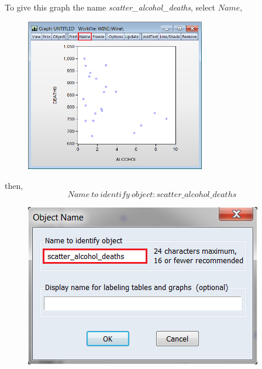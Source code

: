 \documentclass[12pt]{report}
\begin{document}
		\vspace{-\baselineskip}	
		\noindent To give this graph the name \textit{scatter\_alcohol\_deaths}, select $Name$,
		\begin{figure}[H]
			\centerline{\includegraphics[width=0.7\textwidth]{q3_3}}
		\end{figure}
		\vspace{-\baselineskip}	
		then, $$Name\ to\ identify\ object:scatter\_alcohol\_deaths$$
		\begin{figure}[H]
			\centering
			\includegraphics{name1}
		\end{figure}
		\vspace{-\baselineskip}	
\end{document}
